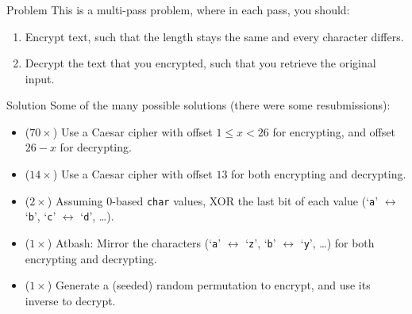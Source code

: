 \begin{frame}
    \frametitle{\problemtitle}
    \begin{block}{Problem}
        This is a multi-pass problem, where in each pass, you should:
        \vspace{-0.5em}
        \begin{enumerate}
            \item Encrypt text, such that the length stays the same and every character differs.
            \item Decrypt the text that you encrypted, such that you retrieve the original input.
        \end{enumerate}
    \end{block}
    \pause
    \begin{block}{Solution}
        Some of the many possible solutions (there were some resubmissions):
        \begin{itemize}
            \addtolength{\leftmargini}{15ex}
            \small
            \item ($70\times$) Use a Caesar cipher with offset $1 \leq x < 26$ for encrypting, and offset $26 - x$ for decrypting.
            \item ($14\times$) Use a Caesar cipher with offset $13$ for both encrypting and decrypting.
            \item ($2\times$) Assuming $0$-based \texttt{char} values, XOR the last bit of each value
                (`\texttt{a}' $\leftrightarrow$ `\texttt{b}',
                `\texttt{c}' $\leftrightarrow$ `\texttt{d}', \dots).
            \item ($1\times$) Atbash: Mirror the characters (`\texttt{a}' $\leftrightarrow$ `\texttt{z}',
            `\texttt{b}' $\leftrightarrow$ `\texttt{y}', \dots)
            for both encrypting and decrypting.
            \item ($1\times$) Generate a (seeded) random permutation to encrypt, and use its inverse to decrypt.
        \end{itemize}
    \end{block}
    \pause
    \solvestats
\end{frame}
